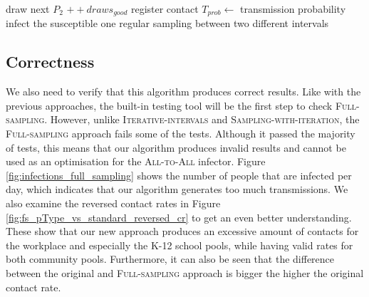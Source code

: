 \begin{algorithm}
\begin{algorithmic}[1]
                                    \State draw next $P_{2}$
                                \EndIf
                                \State $++draws_{good}$
                                \State register contact
                                    \State $T_{prob} \gets$ transmission probability
                                        \State infect the susceptible one
                                    \EndIf
                                \EndIf
                            \EndWhile
                        \EndIf
                    \EndForeach
                \Else
                    \State regular sampling between two different intervals 
                \EndIf
            \EndFor
        \EndFor
    \EndIf
\end{algorithmic}
\end{algorithm}

\subsection{Correctness}
\label{subsec:correctness_fs}
We also need to verify that this algorithm produces correct results. Like with the previous approaches, the built-in testing tool will be the first step to check \textsc{Full-sampling}. However, unlike \textsc{Iterative-intervals} and \textsc{Sampling-with-iteration}, the \textsc{Full-sampling} approach fails some of the tests. Although it passed the majority of tests, this means that our algorithm produces invalid results and cannot be used as an optimisation for the \textsc{All-to-All} infector. Figure \ref{fig:infections_full_sampling} shows the number of people that are infected per day, which indicates that our algorithm generates too much transmissions. We also examine the reversed contact rates in Figure \ref{fig:fs_pType_vs_standard_reversed_cr} to get an even better understanding. These show that our new approach produces an excessive amount of contacts for the workplace and especially the K-12 school pools, while having valid rates for both community pools. Furthermore, it can also be seen that the difference between the original and \textsc{Full-sampling} approach is bigger the higher the original contact rate.

